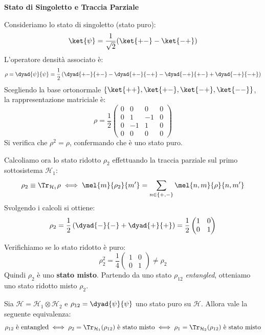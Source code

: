 \begin{example}
    \textbf{Stato di Singoletto e Traccia Parziale}

    Consideriamo lo stato di singoletto (stato puro):
    \[
        \ket{\psi} = \frac{1}{\sqrt{2}} (\ket{+-} - \ket{-+})
    \]
    L'operatore densità associato è:
    \[
        \rho = \dyad{\psi}{\psi} = \frac{1}{2} \left( \dyad{+-}{+-} - \dyad{+-}{-+} - \dyad{-+}{+-} + \dyad{-+}{-+} \right)
    \]
    Scegliendo la base ortonormale \( \{ \ket{++}, \ket{+-}, \ket{-+}, \ket{--} \} \), la rappresentazione matriciale è:
    \[
        \rho = \frac{1}{2}
        \begin{pmatrix}
            0 & 0 & 0 & 0 \\
            0 & 1 & -1 & 0 \\
            0 & -1 & 1 & 0 \\
            0 & 0 & 0 & 0
        \end{pmatrix}
    \]
    Si verifica che \( \rho^2 = \rho \), confermando che è uno stato puro.

    Calcoliamo ora lo stato ridotto \( \rho_2 \) effettuando la traccia parziale sul primo sottosistema \( \mathcal{H}_1 \):
    \[
        \rho_2 \equiv \Tr_{\mathcal{H}_1} \rho \iff \mel{m}{\rho_2}{m'} = \sum_{n \in \{+,-\}} \mel{n,m}{\rho}{n,m'}
    \]
    Svolgendo i calcoli si ottiene:
    \[
        \rho_2 = \frac{1}{2} \left( \dyad{-}{-} + \dyad{+}{+} \right) = \frac{1}{2} 
        \begin{pmatrix} 
            1 & 0 \\ 
            0 & 1 
        \end{pmatrix}
    \]
    
    Verifichiamo se lo stato ridotto è puro:
    \[
        \rho_2^2 = \frac{1}{4} 
        \begin{pmatrix} 
            1 & 0 \\ 
            0 & 1 
        \end{pmatrix} 
        \neq \rho_2
    \]
    Quindi \( \rho_2 \) è uno \textbf{stato misto}.
    Partendo da uno stato \( \rho_{12} \) \textit{entangled}, otteniamo uno stato ridotto misto \( \rho_2 \).
\end{example}

\begin{theorem}
    Sia \(\mathcal{H} = \mathcal{H}_1 \otimes \mathcal{H}_2\) e \(\rho_{12} = \dyad{\psi}{\psi}\) uno stato puro su \(\mathcal{H}\).
    Allora vale la seguente equivalenza:
    \[
        \rho_{12} \text{ è entangled} 
        \iff \rho_2 = \Tr_{\mathcal{H}_1}(\rho_{12}) \text{ è stato misto}
        \iff \rho_1 = \Tr_{\mathcal{H}_2}(\rho_{12}) \text{ è stato misto}
    \]
\end{theorem}

